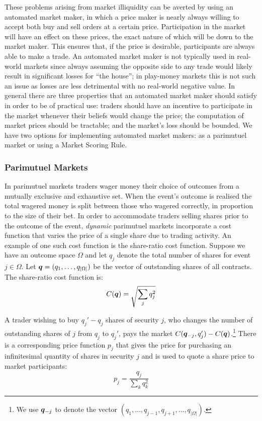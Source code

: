 These problems arising from market illiquidity can be averted by using an
automated market maker, in which a price maker is nearly always willing to
accept both buy and sell orders at a certain price. Participation in the market
will have an effect on these prices, the exact nature of which will be down to
the market maker. This ensures that, if the price is desirable, participants
are always able to make a trade. An automated market maker is not typically
used in real-world markets since always assuming the opposite side to any trade
would likely result in significant losses for ``the house''; in play-money
markets this is not such an issue as losses are less detrimental with no
real-world negative value. In general there are three properties that an
automated market maker should satisfy in order to be of practical use: traders
should have an incentive to participate in the market whenever their beliefs
would change the price; the computation of market prices should be tractable;
and the market's loss should be bounded. We have two options for implementing
automated market makers: as a parimutuel market or using a Market Scoring Rule.

\subsubsection{Parimutuel Markets}

In parimutuel markets traders wager money their choice of outcomes from a
mutually exclusive and exhaustive set. When the event's outcome is realised the
total wagered money is split between those who wagered correctly, in proportion
to the size of their bet. In order to accommodate traders selling shares prior
to the outcome of the event, \emph{dynamic} parimutuel markets incorporate a
cost function that varies the price of a single share due to trading activity.
An example of one such cost function is the share-ratio cost function. Suppose
we have an outcome space $\Omega$ and let $q_j$ denote the total number of
shares for event $j \in \Omega$. Let $\bm{q} = (q_1, \ldots, q_{|\Omega|})$
be the vector of outstanding shares of all contracts. The share-ratio cost
function is:
%
$$ C(\bm{q}) = \sqrt{\sum_j q_j^2} $$

A trader wishing to buy $q_j' - q_j$ shares of security $j$, who changes the
number of outstanding shares of $j$ from $q_j$ to $q_j'$, pays the market
$C(\bm{q}_{-j}, q_j') - C(\bm{q})$.\footnote{We use $\bm{q}_{-j}$ to
denote the vector $(q_1, \ldots, q_{j-1}, q_{j+1}, \ldots, q_{|\Omega|})$.}
There is a corresponding price function $p_j$ that gives the price for
purchasing an infinitesimal quantity of shares in security $j$ and is used to
quote a share price to market participants:
%
$$ p_j = \frac{q_j}{\sum_k q_k^2} $$

